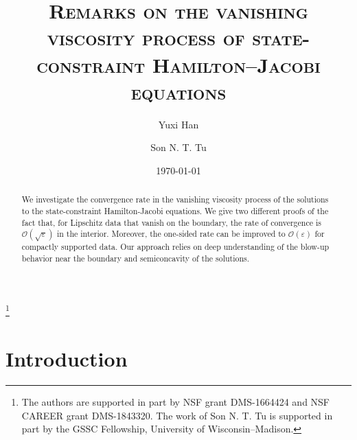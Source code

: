 \documentclass[12pt,reqno]{amsart}
\numberwithin{figure}{section}
\theoremstyle{plain}
\theoremstyle{remark}
\numberwithin{equation}{section}
\begin{document}
\title[Rate of convergence]
{\textsc{Remarks on the vanishing viscosity process of state-constraint Hamilton--Jacobi equations}}
\thanks{The authors are supported in part by NSF grant DMS-1664424 and NSF CAREER grant DMS-1843320. The work of Son N. T. Tu is supported in part by the GSSC Fellowship, University of Wisconsin--Madison.}
\begin{abstract}
We investigate the convergence rate in the vanishing viscosity process of the solutions to the state-constraint Hamilton-Jacobi equations. We give two different proofs of the fact that, for Lipschitz data that vanish on the boundary, the rate of convergence is $\mathcal{O}(\sqrt{\varepsilon})$ in the interior. Moreover, the one-sided rate can be improved to $\mathcal{O}(\varepsilon)$ for compactly supported data. Our approach relies on deep understanding of the blow-up behavior near the boundary and semiconcavity of the solutions.
\end{abstract}
\author{Yuxi Han}
\address[Y. Han]
{
Department of Mathematics, 
University of Wisconsin Madison, 480 Lincoln  Drive, Madison, WI 53706, USA}
\author{Son N. T. Tu}
\address[S. N.T. Tu]
{
Department of Mathematics, 
University of Wisconsin Madison, 480 Lincoln  Drive, Madison, WI 53706, USA}
\date{\today}
\maketitle
\setcounter{tocdepth}{1}

\section{Introduction}\label{sec:intro}
\end{document}
